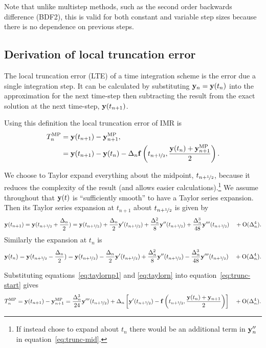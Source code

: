Note that unlike multistep methods, such as the second order backwards difference (BDF2), this is valid for both constant and variable step sizes because there is no dependence on previous steps.


\subsection{Derivation of local truncation error}
\label{sec:deriv-local-trunc}

The local truncation error (LTE) of a time integration scheme is the error due a single integration step.
It can be calculated by substituting $\mathbf{y}_n = \mathbf{y}(t_n)$ into the approximation for the next time-step then subtracting the result from the exact solution at the next time-step, $\mathbf{y}(t_{n+1})$.

Using this definition the local truncation error of IMR is
\begin{align}
  \lte^\IMP &= \yv(t_{n+1}) - \yv_{n+1}^\IMP, \notag\\
  &= \yv(t_{n+1}) - \yv(t_n) - \dtn \fv\left( \thf, \frac{\yv(t_n) + \yv_{n+1}^\IMP}{2} \right).
  \label{eq:trunc-start}
\end{align}

We choose to Taylor expand everything about the midpoint, $t_{n+\nicefrac{1}{2}}$, because it reduces the complexity of the result (and allows easier calculations).\footnote{If instead chose to expand about $t_n$ there would be an additional term in $\mathbf{y}_n''$ in equation~\eqref{eq:trunc-mid}.}
We assume throughout that $\mathbf{y}(t)$ is ``sufficiently smooth'' to have a Taylor series expansion. Then its Taylor series expansion at $t_{n+1}$ about $t_{n+\nicefrac{1}{2}}$ is given by
\begin{equation}
  \yv(t_{n+1}) = \yv(\thf + \frac{\dtn}{2}) = \yvhf + \frac{\dtn}{2} \yvhf['] + \frac{\dtn^2}{8} \yvhf[''] + \frac{\dtn^3}{48} \yvhf['''] \porder{\dtn^4}.
  \label{eq:taylornp1}
\end{equation}
Similarly the expansion at $t_n$ is
\begin{equation}
  \yv(t_n) = \yv(\thf - \frac{\dtn}{2}) = \yvhf - \frac{\dtn}{2} \yvhf['] + \frac{\dtn^2}{8} \yvhf[''] - \frac{\dtn^3}{48} \yvhf['''] \porder{\dtn^4}.
  \label{eq:taylorn}
\end{equation}

Substituting equations~\eqref{eq:taylornp1} and \eqref{eq:taylorn} into equation~\eqref{eq:trunc-start} gives
\begin{equation}
  \lte^\IMP = \yv(t_{n+1}) - \yv_{n+1}^\IMP
  = \frac{\dtn^3}{24} \yvhf[''']  + \dtn  \left[ \yvhf[']
  - \fv\left( \thf, \frac{\yv(t_n) + \yv_{n+1}}{2} \right) \right]  \porder{\dtn^4}.
  \label{eq:trunc-mid}
\end{equation}

